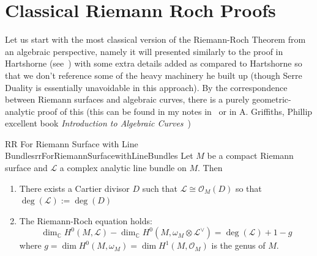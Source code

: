 \documentclass{ut-thesis}
\newcommand{\C}{{\mathbb{C}}}
\newcommand{\CL}{{\mathcal{L}}}
\newcommand{\CO}{{\mathcal{O}}}
\renewcommand{\deg}{{\operatorname{deg}}}
\begin{document}
\section{Classical Riemann Roch Proofs}\label{sec:RR}

%

Let us start with the most classical version of the Riemann-Roch Theorem from an algebraic perspective, namely
it will presented similarly to the proof in Hartshorne (see~\cite{hartshorneAlgebraicGeometry2013}) with some
extra details added as compared to Hartshorne so that we don't reference some of the heavy machinery he built
up (though Serre Duality is essentially unavoidable in this approach). By the correspondence between Riemann
surfaces and algebraic curves, there is a purely geometric-analytic proof of this (this can be found in my
notes in~\cite{NateComplexAnalysis} or in A. Griffiths, Phillip excellent book \emph{Introduction to Algebraic
Curves}~\cite{a.griffithsIntroductionAlgebraicCurves})

\begin{thm}{RR For Riemann Surface with Line Bundles}{rrForRiemannSurfacewithLineBundles}
  Let $M$ be a compact Riemann surface and $\CL$ a complex analytic line bundle on $M$. Then
  \begin{enumerate}
    \item There exists a Cartier divisor $D$ such that $\CL\cong \CO_M(D)$ so that $\deg(\CL) := \deg(D)$
    \item The Riemann-Roch equation holds:
      \[
        \dim_\C H^0(M, \CL) - \dim_\C H^0(M, \omega_M\otimes \CL^\vee) = \deg(\CL) + 1-g
      \]
      where $g = \dim H^0(M, \omega_M) = \dim H^1(M, \CO_M)$ is the genus of $M$.
  \end{enumerate}
\end{thm}
\end{document}

